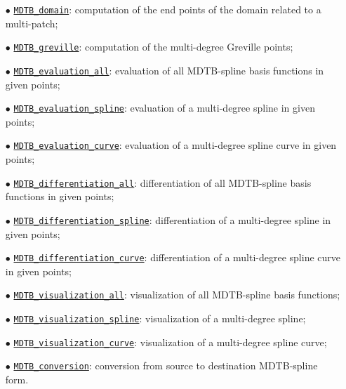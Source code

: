 \documentclass[10pt]{acmtrans2e}
\begin{document}
\begin{itemize}
  \item[$\bullet$] \hyperref[sec:matlab-mdtb-domain]{\texttt{MDTB\_domain}}: 
    computation of the end points of the domain related to a multi-patch;
  \item[$\bullet$] \hyperref[sec:matlab-mdtb-greville]{\texttt{MDTB\_greville}}: 
    computation of the multi-degree Greville points;
  \item[$\bullet$] \hyperref[sec:matlab-mdtb-evaluation-all]{\texttt{MDTB\_evaluation\_all}}: 
    evaluation of all MDTB-spline basis functions in given points;
  \item[$\bullet$] \hyperref[sec:matlab-mdtb-evaluation-spline]{\texttt{MDTB\_evaluation\_spline}}: 
    evaluation of a multi-degree spline in given points;
  \item[$\bullet$] \hyperref[sec:matlab-mdtb-evaluation-curve]{\texttt{MDTB\_evaluation\_curve}}: 
    evaluation of a multi-degree spline curve in given points;
  \item[$\bullet$] \hyperref[sec:matlab-mdtb-differentiation-all]{\texttt{MDTB\_differentiation\_all}}: 
    differentiation of all MDTB-spline basis functions in given points;
  \item[$\bullet$] \hyperref[sec:matlab-mdtb-differentiation-spline]{\texttt{MDTB\_differentiation\_spline}}: 
    differentiation of a multi-degree spline in given points;
  \item[$\bullet$] \hyperref[sec:matlab-mdtb-differentiation-curve]{\texttt{MDTB\_differentiation\_curve}}: 
    differentiation of a multi-degree spline curve in given points;
  \item[$\bullet$] \hyperref[sec:matlab-mdtb-visualization-all]{\texttt{MDTB\_visualization\_all}}: 
    visualization of all MDTB-spline basis functions;
  \item[$\bullet$] \hyperref[sec:matlab-mdtb-visualization-spline]{\texttt{MDTB\_visualization\_spline}}: 
    visualization of a multi-degree spline;
  \item[$\bullet$] \hyperref[sec:matlab-mdtb-visualization-curve]{\texttt{MDTB\_visualization\_curve}}: 
    visualization of a multi-degree spline curve;
  \item[$\bullet$] \hyperref[sec:matlab-mdtb-conversion]{\texttt{MDTB\_conversion}}: 
    conversion from source to destination MDTB-spline form.
\end{itemize}

\end{document}
